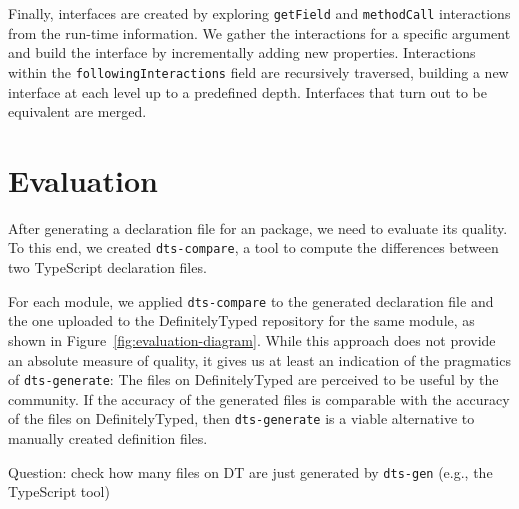 \documentclass[english,cleveref,autoref,submission]{programming}
\newenvironment{changethis}{%
  \begin{tcolorbox}[breakable,notitle,boxrule=0pt,colback=blue!20,colframe=blue!20]}{%
  \end{tcolorbox}}
\newcommand{\figref}[1]{Figure~\ref{#1}}
\begin{document}
Finally, interfaces are created by exploring \texttt{getField} and \texttt{methodCall} interactions from the run-time information. We
gather the interactions for a specific argument and build the
interface by incrementally adding new properties. Interactions within
the \texttt{followingInteractions} field are recursively traversed,
building a new interface at each level up to a predefined depth. Interfaces that turn out
to be equivalent are merged.

\section{Evaluation}
\label{sec:dts-generate-evaluation}
After generating a declaration file for an \NPM{} package, we need to
evaluate its quality. To this end, we created \texttt{dts-compare}, a tool to compute the
differences between two TypeScript declaration files.

For each module, we applied \texttt{dts-compare} to the generated declaration file and the
one uploaded to the DefinitelyTyped repository for the same module, as shown in
\figref{fig:evaluation-diagram}. While this approach does not provide an absolute measure
of quality, it gives us at least an indication of the pragmatics of \texttt{dts-generate}:
The files on DefinitelyTyped are perceived to be useful by the community. If the accuracy
of the generated files is comparable with the accuracy of the files on DefinitelyTyped,
then \texttt{dts-generate} is a viable alternative to manually created definition files.

\begin{changethis}
  Question: check how many files on DT are just generated by \texttt{dts-gen} (e.g., the TypeScript tool)
\end{changethis}
 
\end{document}
